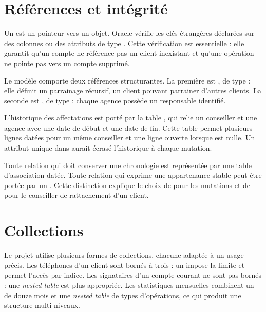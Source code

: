 \section{Références et intégrité}

Un  est un pointeur vers un objet. Oracle vérifie les clés étrangères
déclarées sur des colonnes ou des attributs de type . Cette
vérification est essentielle : elle garantit qu'un compte ne référence pas un
client inexistant et qu'une opération ne pointe pas vers un compte supprimé.

Le modèle comporte deux références structurantes. La première est
, de type
 : elle définit
un parrainage récursif, un client pouvant parrainer d'autres clients. La seconde
est , de type
 :
chaque agence possède un responsable identifié.

L'historique des affectations est porté par la table , qui
relie un conseiller et une agence avec une date de début et une date de fin.
Cette table permet plusieurs lignes datées pour un même conseiller et une ligne
ouverte lorsque  est nulle. Un attribut unique
 dans  aurait écrasé l'historique à
chaque mutation.

\begin{clebox}
Toute relation qui doit conserver une chronologie est représentée par une table
d'association datée. Toute relation qui exprime une appartenance stable peut
être portée par un . Cette distinction explique le choix de
 pour les mutations et de  pour le
conseiller de rattachement d'un client.
\end{clebox}

\section{Collections}

Le projet utilise plusieurs formes de collections, chacune adaptée à un usage
précis. Les téléphones d'un client sont bornés à trois : un 
impose la limite et permet l'accès par indice. Les signataires d'un compte
courant ne sont pas bornés : une \emph{nested table} est plus appropriée. Les
statistiques mensuelles combinent un  de douze mois et une
\emph{nested table} de types d'opérations, ce qui produit une structure
multi-niveaux.

